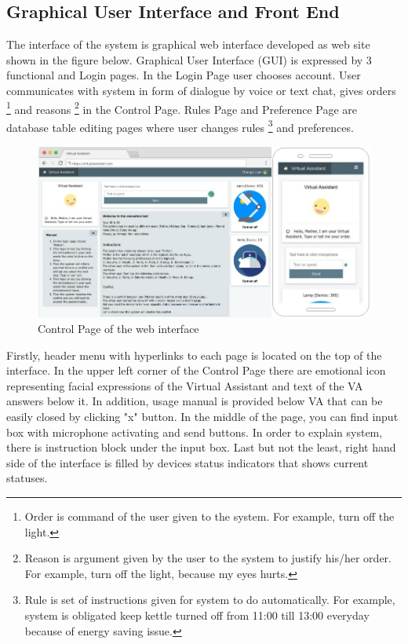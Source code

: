 \documentclass{llncs}
\begin{document}
    \subsection{Graphical User Interface and Front End}
    The interface of the system is graphical web interface developed as web site shown in the figure below.
    Graphical User Interface (GUI) is expressed by 3 functional and Login pages.
    In the Login Page user chooses account.
    User communicates with system in form of dialogue by voice or text chat,
    gives orders \footnote{Order is command of the user given to the system.
    For example, turn off the light.} and reasons \footnote{Reason is argument given by the user to the system to
    justify his/her order.
    For example, turn off the light, because my eyes hurts.} in the Control Page.
    Rules Page and Preference Page are database table editing pages where user changes rules \footnote{Rule is set of instructions given for system to do automatically.
    For example, system is obligated keep kettle turned off from 11:00 till 13:00 everyday because of energy saving issue.} and preferences.\\
    \begin{figure}
        \includegraphics[width=\textwidth]{mockup.png}
        \caption[]{Control Page of the web interface}
    \end{figure}
    Firstly, header menu with hyperlinks to each page is located on the top of the interface.
    In the upper left corner of the Control Page there are emotional icon representing facial expressions of the Virtual Assistant
    and text of the VA answers below it.
    In addition, usage manual is provided below VA that can be easily closed by clicking "x" button.
    In the middle of the page, you can find input box with microphone activating and send buttons.
    In order to explain system, there is instruction block under the input box.
    Last but not the least, right hand side of the interface is filled by devices status indicators that shows current statuses.
\end{document}
